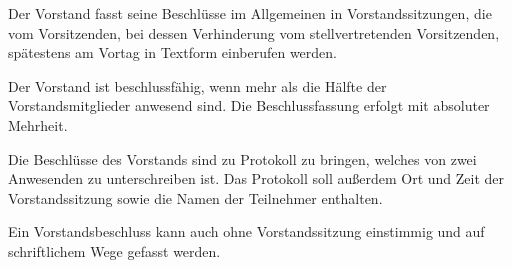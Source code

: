\begin{contract}
	\item Der Vorstand fasst seine Beschlüsse im Allgemeinen in Vorstandssitzungen, die vom Vorsitzenden, bei dessen Verhinderung vom stellvertretenden Vorsitzenden, spätestens am Vortag in Textform einberufen werden. 
	\item Der Vorstand ist beschlussfähig, wenn mehr als die Hälfte der Vorstandsmitglieder anwesend sind. Die Beschlussfassung erfolgt mit absoluter Mehrheit.
	\item Die Beschlüsse des Vorstands sind zu Protokoll zu bringen, welches von zwei Anwesenden zu unterschreiben ist. Das Protokoll soll außerdem Ort und Zeit der Vorstandssitzung sowie die Namen der Teilnehmer enthalten.
	\item Ein Vorstandsbeschluss kann auch ohne Vorstandssitzung einstimmig und auf schriftlichem Wege gefasst werden.


\end{contract}
